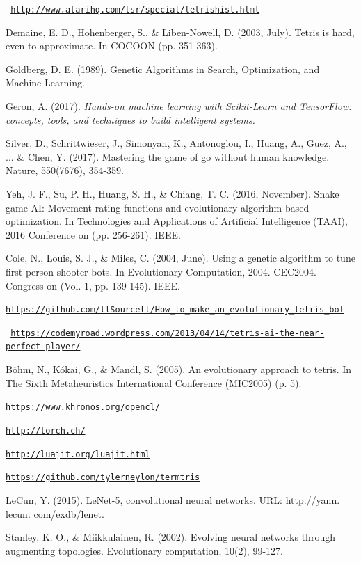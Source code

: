 \documentclass[conference]{IEEEtran}
\begin{document}
\begin{thebibliography}{00}

 \texttt{ \url{http://www.atarihq.com/tsr/special/tetrishist.html}}

 Demaine, E. D., Hohenberger, S., \& Liben-Nowell, D. (2003, July). Tetris is hard, even to approximate. In COCOON (pp. 351-363).

 Goldberg, D. E. (1989). Genetic Algorithms in Search, Optimization, and Machine Learning.

  Geron, A. (2017). \textit{Hands-on machine learning with Scikit-Learn and TensorFlow: concepts, tools, and techniques to build intelligent systems.}

 Silver, D., Schrittwieser, J., Simonyan, K., Antonoglou, I., Huang, A., Guez, A., ... \& Chen, Y. (2017). Mastering the game of go without human knowledge. Nature, 550(7676), 354-359.

 Yeh, J. F., Su, P. H., Huang, S. H., \& Chiang, T. C. (2016, November). Snake game AI: Movement rating functions and evolutionary algorithm-based optimization. In Technologies and Applications of Artificial Intelligence (TAAI), 2016 Conference on (pp. 256-261). IEEE.

 Cole, N., Louis, S. J., \& Miles, C. (2004, June). Using a genetic algorithm to tune first-person shooter bots. In Evolutionary Computation, 2004. CEC2004. Congress on (Vol. 1, pp. 139-145). IEEE.

 \texttt{\url{https://github.com/llSourcell/How_to_make_an_evolutionary_tetris_bot}}

 \texttt{ \url{https://codemyroad.wordpress.com/2013/04/14/tetris-ai-the-near-perfect-player/}}

 Böhm, N., Kókai, G., \& Mandl, S. (2005). An evolutionary approach to tetris. In The Sixth Metaheuristics International Conference (MIC2005) (p. 5).

 \texttt{\url{https://www.khronos.org/opencl/}}

 \texttt{\url{http://torch.ch/}}

 \texttt{\url{http://luajit.org/luajit.html}}

 \texttt{\url{https://github.com/tylerneylon/termtris}}

 LeCun, Y. (2015). LeNet-5, convolutional neural networks. URL: http://yann. lecun. com/exdb/lenet.

 Stanley, K. O., \& Miikkulainen, R. (2002). Evolving neural networks through augmenting topologies. Evolutionary computation, 10(2), 99-127.

\end{thebibliography}
\end{document}

